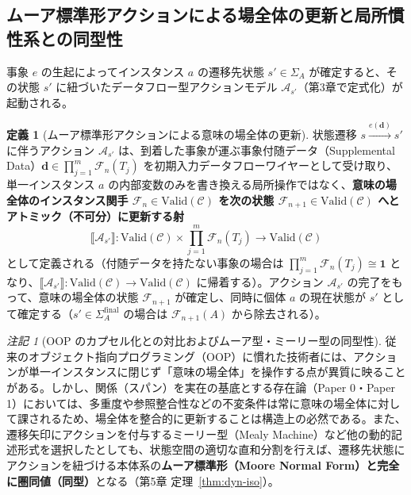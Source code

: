 \documentclass[11pt,a4paper]{ltjsarticle}
\theoremstyle{definition}
\newtheorem{definition}{定義}[section]
\theoremstyle{plain}
\theoremstyle{remark}
\newtheorem{remark}{注記}[section]
\newcommand{\Valid}{\mathrm{Valid}}
\begin{document}
\subsection{ムーア標準形アクションによる場全体の更新と局所慣性系との同型性}
事象 $e$ の生起によってインスタンス $a$ の遷移先状態 $s' \in \Sigma_A$ が確定すると、その状態 $s'$ に紐づいたデータフロー型アクションモデル $\mathcal{A}_{s'}$（第3章で定式化）が起動される。

\begin{definition}[ムーア標準形アクションによる意味の場全体の更新]\label{def:moore-action}
状態遷移 $s \xrightarrow{e(\mathbf{d})} s'$ に伴うアクション $\mathcal{A}_{s'}$ は、到着した事象が運ぶ事象付随データ（Supplemental Data）$\mathbf{d} \in \prod_{j=1}^m \mathcal{F}_n(T_j)$ を初期入力データフローワイヤーとして受け取り、単一インスタンス $a$ の内部変数のみを書き換える局所操作ではなく、\textbf{意味の場全体のインスタンス関手 $\mathcal{F}_n \in \Valid(\mathcal{C})$ を次の状態 $\mathcal{F}_{n+1} \in \Valid(\mathcal{C})$ へとアトミック（不可分）に更新する射}
\begin{equation}
\llbracket \mathcal{A}_{s'} \rrbracket : \Valid(\mathcal{C}) \times \prod_{j=1}^m \mathcal{F}_n(T_j) \longrightarrow \Valid(\mathcal{C})
\end{equation}
として定義される（付随データを持たない事象の場合は $\prod_{j=1}^m \mathcal{F}_n(T_j) \cong \mathbf{1}$ となり、$\llbracket \mathcal{A}_{s'} \rrbracket : \Valid(\mathcal{C}) \to \Valid(\mathcal{C})$ に帰着する）。アクション $\mathcal{A}_{s'}$ の完了をもって、意味の場全体の状態 $\mathcal{F}_{n+1}$ が確定し、同時に個体 $a$ の現在状態が $s'$ として確定する（$s' \in \Sigma_A^{\mathrm{final}}$ の場合は $\mathcal{F}_{n+1}(A)$ から除去される）。
\end{definition}

\begin{remark}[OOP のカプセル化との対比およびムーア型・ミーリー型の同型性]\label{rem:moore-mealy}
従来のオブジェクト指向プログラミング（OOP）に慣れた技術者には、アクションが単一インスタンスに閉じず「意味の場全体」を操作する点が異質に映ることがある。しかし、関係（スパン）を実在の基底とする存在論（Paper 0・Paper 1）においては、多重度や参照整合性などの不変条件は常に意味の場全体に対して課されるため、場全体を整合的に更新することは構造上の必然である。また、遷移矢印にアクションを付与するミーリー型（Mealy Machine）など他の動的記述形式を選択したとしても、状態空間の適切な直和分割を行えば、遷移先状態にアクションを紐づける本体系の\textbf{ムーア標準形（Moore Normal Form）と完全に圏同値（同型）}となる（第5章 定理~\ref{thm:dyn-iso}）。
\end{remark}
\end{document}
